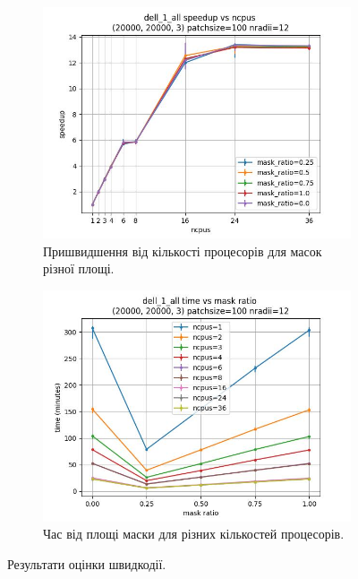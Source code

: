 \begin{figure}[h]
    \begin{subfigure}{0.45\textwidth}
    \includegraphics[width=0.99\linewidth]{img/fastlbp/speedup_ncpus.jpg}
    \caption{
        Пришвидшення від кількості процесорів для масок різної площі.
    }
    \label{subfig:parallell-efficiency-b}
    \end{subfigure}%
    \begin{subfigure}{0.45\textwidth}
    \includegraphics[width=0.99\linewidth]{img/fastlbp/time_mr.jpg}
    \caption{
        Час від площі маски для різних кількостей процесорів.
    }
    \label{subfig:parallell-efficiency-с}
    \end{subfigure}
    
    \caption{Результати оцінки швидкодії.}
    \label{fig:parallell-efficiency}
\end{figure}
